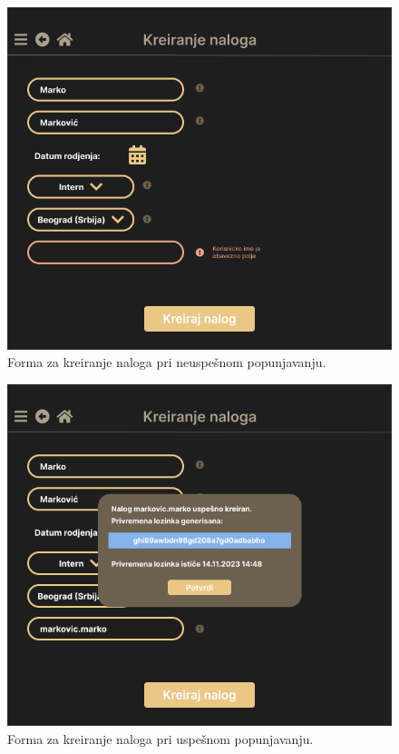 \documentclass[a4paper]{article}
\begin{document}
\begin{figure} [!ht]
    \begin{center}
        \includegraphics[scale=0.33]{UI/Administrator/Administrator_KreiranjeNaloga_ObaveznoPolje.png}
    \end{center}
\caption{Forma za kreiranje naloga pri neuspešnom popunjavanju.}
\end{figure}

\begin{figure} [!ht]
    \begin{center}
        \includegraphics[scale=0.33]{UI/Administrator/Administrator_KreiranjeNaloga_Uspesno.png}
    \end{center}
\caption{Forma za kreiranje naloga pri uspešnom popunjavanju.}
\end{figure}
\end{document}
